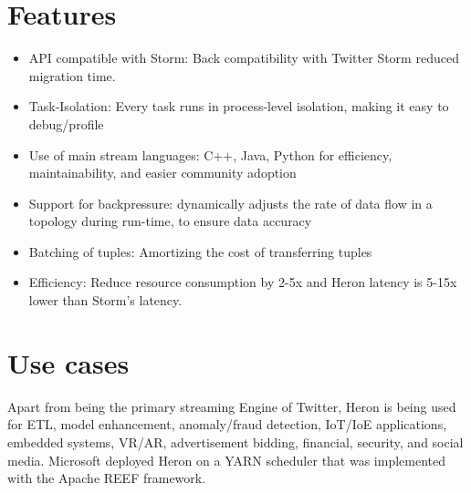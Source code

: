 \documentclass[9pt,twocolumn,twoside]{styles/osajnl}
\begin{document}
\section{Features}
\begin{itemize}
    \item API compatible with Storm: Back compatibility with Twitter Storm reduced migration time. 
    \item Task-Isolation: Every task runs in process-level isolation, making it easy to debug/profile
    \item Use of main stream languages: C++, Java, Python for efficiency, maintainability, and easier community adoption
    \item Support for backpressure: dynamically adjusts the rate of data flow in a topology during run-time, to ensure data accuracy
    \item Batching of tuples: Amortizing the cost of transferring tuples
    \item Efficiency: Reduce resource consumption by 2-5x and Heron latency is 5-15x lower than Storm’s latency. \cite{www-FlyFasterHeron}
\end{itemize}
\section{Use cases}
Apart from being the primary streaming Engine of Twitter, Heron is being used for ETL, model enhancement, anomaly/fraud detection, IoT/IoE applications, embedded systems, VR/AR, advertisement bidding, financial, security, and social media\cite{www-openSourceHeron}. Microsoft deployed Heron on a YARN scheduler that was implemented with the Apache REEF framework.\cite{www-HeronYARN}
\end{document}
